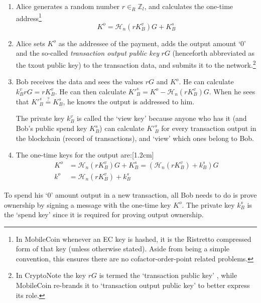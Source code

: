 \begin{enumerate}
	\item Alice generates a random number $r \in_R \mathbb{Z}_l$, and calculates the one-time address\footnote{In MobileCoin whenever an EC key is hashed, it is the Ristretto compressed form of that key (unless otherwise stated). Aside from being a simple convention, this ensures there are no cofactor-order-point related problems.}\vspace{.175cm}
	\[K^o  = \mathcal{H}_n(r K_B^v)G + K_B^s\]

	\item Alice sets $K^o$ as the addressee of the payment, adds the output amount `0' and the so-called {\em transaction output public key} $r G$ (henceforth abbreviated as the txout public key) to the transaction data, and submits it to the network.\footnote{In CryptoNote the key $r G$ is termed the `transaction public key' \cite{cryptoNoteWhitePaper}, while MobileCoin re-brands it to `transaction output public key' to better express its role.}

	\item Bob receives the data and sees the values $r G$ and $K^o$. He can calculate $k_B^v r G = r K_B^v$. He can then calculate $K'^s_B = K^o - \mathcal{H}_n(r K_B^v)G$. When he sees that $K'^s_B \stackrel{?}{=} K_B^s$, he knows the output is addressed to him.

	The private key $k_B^v$ is called the `view key' because anyone who has it (and Bob’s public spend key $K_B^s$) can calculate $K'^s_B$ for every transaction output in the blockchain (record of transactions), and ‘view’ which ones belong to Bob.

	\item The one-time keys for the output are:[1.2cm]\vspace{.175cm}
	\begin{align*}
		K^o &= \mathcal{H}_n(r K_B^v)G + K_B^s = (\mathcal{H}_n(r K_B^v) + k_B^s)G  \\ 
		k^o &= \mathcal{H}_n(r K_B^v) + k_B^s
	\end{align*}
\end{enumerate}

To spend his `0' amount output in a new transaction, all Bob needs to do is prove ownership by signing a message with the one-time key $K^o$. The private key $k_B^s$ is the `spend key' since it is required for proving output ownership.

